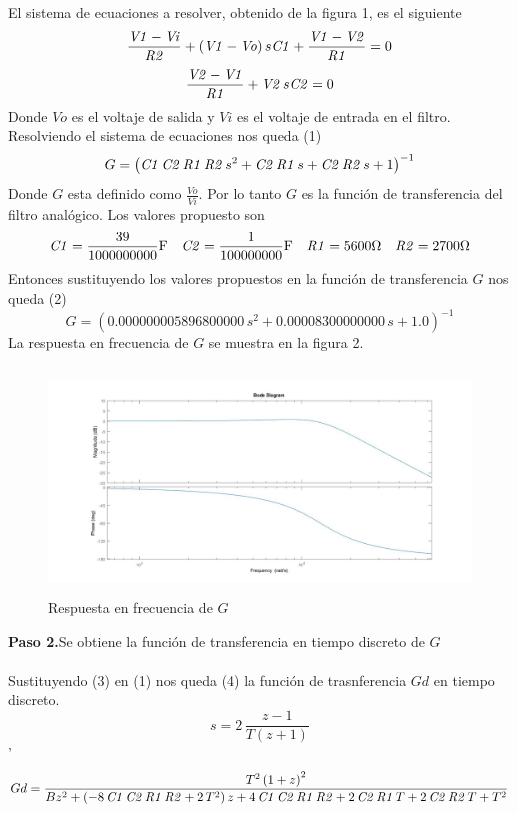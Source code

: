\documentclass[12pt]{article}
\begin{document}
El sistema de ecuaciones a resolver, obtenido de la figura 1, es el siguiente
$${\frac {{\it V1}-{\it Vi}}{{\it R2}}}+ \left( {\it V1}-{\it Vo}
 \right) s{\it C1}+{\frac {{\it V1}-{\it V2}}{{\it R1}}}=0
$$
$${\frac {{\it V2}-{\it V1}}{{\it R1}}}+{\it V2}\,s{\it C2}=0$$
Donde $Vo$ es el voltaje de salida y $Vi$ es el voltaje de entrada en el filtro. Resolviendo el sistema de ecuaciones nos queda (1)
\begin{equation}
  G=  \left( {\it C1}\,{\it C2}\,{\it R1}\,{\it R2}\,{s}^{2}+{\it C2}\,{
\it R1}\,s+{\it C2}\,{\it R2}\,s+1 \right) ^{-1}
\end{equation}
Donde $G$ esta definido como $\frac{Vo}{Vi}$. Por lo tanto $G$ es la función de transferencia del filtro analógico. Los valores propuesto son 
$${\it C1}={\frac {39}{1000000000}}\text{F}\quad {\it C2}={\frac {1}{100000000}}\text{F}\quad {\it R1}=5600\Omega\quad {\it R2}=2700\Omega $$
Entonces sustituyendo los valores propuestos en la función de transferencia $G$ nos queda (2)
\begin{equation}
    G=\left(  0.000000005896800000\,{s}^{2}+ 0.00008300000000\,s+ 1.0
 \right) ^{-1}
\end{equation}
La respuesta en frecuencia de $G$ se muestra en la figura 2.
\begin{figure}[h]
        \centering
        \includegraphics[width=14cm, height=6cm]{im1.jpg}
        \caption{Respuesta en frecuencia de $G$}
\end{figure}

\textbf{Paso 2.}Se obtiene la función de transferencia en tiempo discreto de $G$\\\\
Sustituyendo (3) en (1) nos queda (4) la función de trasnferencia $Gd$ en tiempo discreto.
\begin{equation}
    s=2\,{\frac {z-1}{T \left( z+1 \right) }}
\end{equation}
'\begin{equation}
    Gd={\frac {{T}^{2} \left( 1+z \right) ^{2}}{ B {z}^{2}+ \left( -8\,{\it C1}\,{\it C2}\,{\it R1}\,{
\it R2}+2\,{T}^{2} \right) z+4\,{\it C1}\,{\it C2}\,{\it R1}\,{\it R2}
+2\,{\it C2}\,{\it R1}\,T+2\,{\it C2}\,{\it R2}\,T+{T}^{2}}}
\end{equation}
\end{document}
